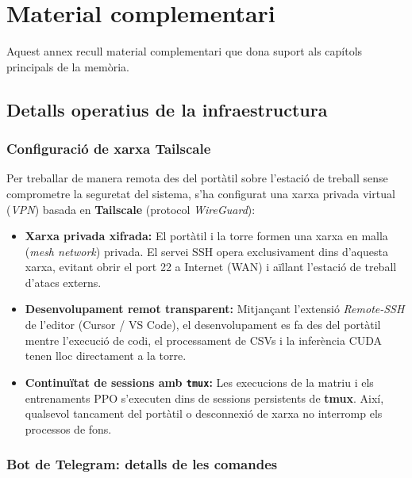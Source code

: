\chapter{Material complementari}
\label{chap:appendix}

Aquest annex recull material complementari que dona suport als capítols principals de la memòria.

\section{Detalls operatius de la infraestructura}
\label{sec:app_infra}

\subsection{Configuració de xarxa Tailscale}

Per treballar de manera remota des del portàtil sobre l'estació de treball sense comprometre la seguretat del sistema, s'ha configurat una xarxa privada virtual (\emph{VPN}) basada en \textbf{Tailscale} (protocol \textit{WireGuard}):

\begin{itemize}
    \item \textbf{Xarxa privada xifrada:} El portàtil i la torre formen una xarxa en malla (\emph{mesh network}) privada. El servei SSH opera exclusivament dins d'aquesta xarxa, evitant obrir el port 22 a Internet (WAN) i aïllant l'estació de treball d'atacs externs.
    \item \textbf{Desenvolupament remot transparent:} Mitjançant l'extensió \textit{Remote-SSH} de l'editor (Cursor / VS Code), el desenvolupament es fa des del portàtil mentre l'execució de codi, el processament de CSVs i la inferència CUDA tenen lloc directament a la torre.
    \item \textbf{Continuïtat de sessions amb \texttt{tmux}:} Les execucions de la matriu i els entrenaments PPO s'executen dins de sessions persistents de \textbf{tmux}. Així, qualsevol tancament del portàtil o desconnexió de xarxa no interromp els processos de fons.
\end{itemize}

\subsection{Bot de Telegram: detalls de les comandes}

